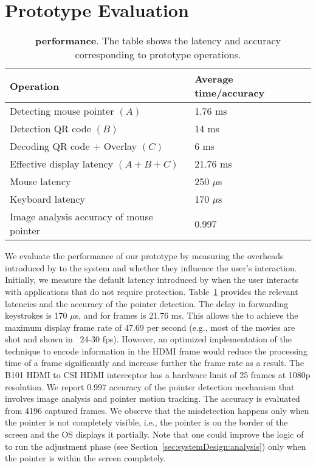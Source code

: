\section{Prototype Evaluation}
\label{sec:eval_protection}



\begin{table}[t]
\small
\centering
\begin{tabular}{ll}
\textbf{Operation} & \textbf{Average time/accuracy} \\\toprule
Detecting mouse pointer $(A)$ & 1.76 ms \\
Detection QR code $(B)$ & 14 ms\\
Decoding QR code + Overlay $(C)$ & 6 ms\\
Effective display latency $(A+B+C)$ & 21.76 ms \\
Mouse latency & 250 $\mu$s\\
Keyboard latency & 170 $\mu$s\\\midrule
Image analysis accuracy of mouse pointer & 0.997 \\\bottomrule
\end{tabular} 
\caption[\device performance in terms of latency and accuracy]{\textbf{\device performance}. The table shows the latency and accuracy corresponding to \name prototype operations.}
\label{tab:performance}
\end{table}

We evaluate the performance of our prototype by measuring the overheads introduced by \name to the system and whether they influence the user's interaction. Initially, we measure the default latency introduced by \device when the user interacts with applications that do not require protection. Table~\ref{tab:performance} provides the relevant latencies and the accuracy of the pointer detection.
The delay in forwarding keystrokes is 170 $\mu$s, and for frames is 21.76 ms. This allows the \device to achieve the maximum display frame rate of 47.69 per second (e.g., most of the movies are shot and shown in  ~24-30 fps). However, an optimized implementation of the technique to encode information in the HDMI frame would reduce the processing time of a frame significantly and increase further the frame rate as a result. The B101 HDMI to CSI HDMI interceptor has a hardware limit of 25 frames at 1080p resolution. We report 0.997 accuracy of the pointer detection mechanism that involves image analysis and pointer motion tracking. The accuracy is evaluated from 4196 captured frames.
We observe that the misdetection happens only when the pointer is not completely visible, i.e., the pointer is on the border of the screen and the OS displays it partially. Note that one could improve the logic of \device to run the adjustment phase (see Section~\ref{sec:systemDesign:analysis}) only when the pointer is within the screen completely.

